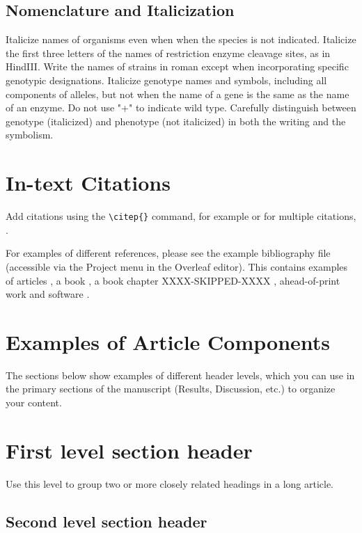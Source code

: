 \documentclass[9pt,twocolumn,twoside]{g3_article/gsag3jnl}
\begin{document}
\subsection*{Nomenclature and Italicization} Italicize names of organisms even when  when the species is not indicated.  Italicize the first three letters of the names of restriction enzyme cleavage sites, as in HindIII. Write the names of strains in roman except when incorporating specific genotypic designations. Italicize genotype names and symbols, including all components of alleles, but not when the name of a gene is the same as the name of an enzyme. Do not use "+" to indicate wild type. Carefully distinguish between genotype (italicized) and phenotype (not italicized) in both the writing and the symbolism.

\section*{In-text Citations}

Add citations using the \verb|\citep{}| command, for example \citep{neher2013genealogies} or for multiple citations, \citep{neher2013genealogies, rodelsperger2014characterization}.

For examples of different references, please see the example bibliography file 
(accessible via the Project menu in the Overleaf editor). This contains examples 
of articles \citep{neher2013genealogies, rodelsperger2014characterization}, a 
book \citep{Sturtevent2001}, a book 
chapter 
XXXX-SKIPPED-XXXX
, ahead-of-print work \citep{Starita2015} and software \citep{Kruijer2015}.

\section*{Examples of Article Components}
\label{sec:examples}

The sections below show examples of different header levels, which you can use in the primary sections of the manuscript (Results, Discussion, etc.) to organize your content.

\section*{First level section header}

Use this level to group two or more closely related headings in a long article.

\subsection*{Second level section header}
\end{document}
